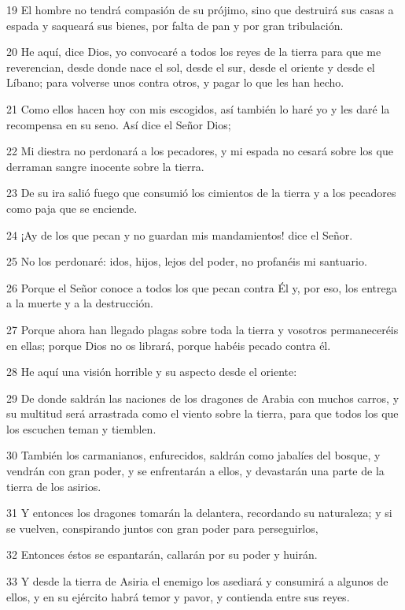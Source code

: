\par 19 El hombre no tendrá compasión de su prójimo, sino que destruirá sus casas a espada y saqueará sus bienes, por falta de pan y por gran tribulación.
\par 20 He aquí, dice Dios, yo convocaré a todos los reyes de la tierra para que me reverencian, desde donde nace el sol, desde el sur, desde el oriente y desde el Líbano; para volverse unos contra otros, y pagar lo que les han hecho.
\par 21 Como ellos hacen hoy con mis escogidos, así también lo haré yo y les daré la recompensa en su seno. Así dice el Señor Dios;
\par 22 Mi diestra no perdonará a los pecadores, y mi espada no cesará sobre los que derraman sangre inocente sobre la tierra.
\par 23 De su ira salió fuego que consumió los cimientos de la tierra y a los pecadores como paja que se enciende.
\par 24 ¡Ay de los que pecan y no guardan mis mandamientos! dice el Señor.
\par 25 No los perdonaré: idos, hijos, lejos del poder, no profanéis mi santuario.
\par 26 Porque el Señor conoce a todos los que pecan contra Él y, por eso, los entrega a la muerte y a la destrucción.
\par 27 Porque ahora han llegado plagas sobre toda la tierra y vosotros permaneceréis en ellas; porque Dios no os librará, porque habéis pecado contra él.
\par 28 He aquí una visión horrible y su aspecto desde el oriente:
\par 29 De donde saldrán las naciones de los dragones de Arabia con muchos carros, y su multitud será arrastrada como el viento sobre la tierra, para que todos los que los escuchen teman y tiemblen.
\par 30 También los carmanianos, enfurecidos, saldrán como jabalíes del bosque, y vendrán con gran poder, y se enfrentarán a ellos, y devastarán una parte de la tierra de los asirios.
\par 31 Y entonces los dragones tomarán la delantera, recordando su naturaleza; y si se vuelven, conspirando juntos con gran poder para perseguirlos,
\par 32 Entonces éstos se espantarán, callarán por su poder y huirán.
\par 33 Y desde la tierra de Asiria el enemigo los asediará y consumirá a algunos de ellos, y en su ejército habrá temor y pavor, y contienda entre sus reyes.
